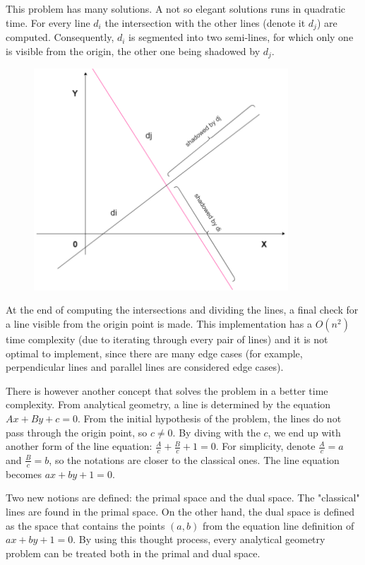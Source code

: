 \documentclass[letterpaper]{article}
\begin{document}
This problem has many solutions. A not so elegant solutions runs in quadratic time. For every line $d_i$ the intersection with the other lines (denote it $d_j$) are computed. Consequently, $d_i$ is segmented into two semi-lines, for which only one is visible from the origin, the other one being shadowed by $d_j$. 

\newpage

\begin{figure} [h!]
\centering
\includegraphics[width=0.85\textwidth]{pngOfDiagrams/dual2.png}
\end{figure}

At the end of computing the intersections and dividing the lines, a final check for a line visible from the origin point is made. This implementation has a $O(n^2)$ time complexity (due to iterating through every pair of lines) and it is not optimal to implement, since there are many edge cases (for example, perpendicular lines and parallel lines are considered edge cases).

There is however another concept that solves the problem in a better time complexity. From analytical geometry, a line is determined by the equation $Ax + By + c = 0$. From the initial hypothesis of the problem, the lines do not pass through the origin point, so $c \neq 0$. By diving with the $c$, we end up with another form of the line equation: $\frac{A}{c} + \frac{B}{c} + 1 = 0$. For simplicity, denote $\frac{A}{c} = a$ and $\frac{B}{c} = b$, so the notations are closer to the classical ones. The line equation becomes $ax + by + 1 = 0$.

Two new notions are defined: the primal space and the dual space. The "classical" lines are found in the primal space. On the other hand, the dual space is defined as the space that contains the points $(a,b)$ from the equation line definition of $ax + by + 1 = 0$. By using this thought process, every analytical geometry problem can be treated both in the primal and dual space. 
\end{document}
